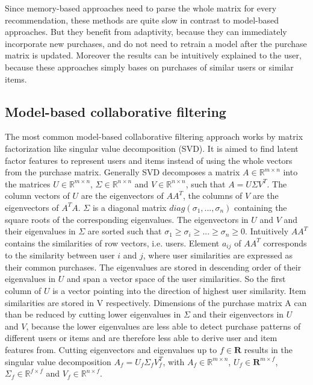 \documentclass[10pt]{reportMaster}
\begin{document}
Since memory-based approaches need to parse the whole matrix for every recommendation, these methods are quite slow in contrast to model-based approaches.
But they benefit from adaptivity, because they can immediately incorporate new purchases, and do not need to retrain a model after the purchase matrix is updated.
Moreover the results can be intuitively explained to the user, because these approaches simply bases on purchases of similar users or similar items.

\subsection{Model-based collaborative filtering}
The most common model-based collaborative filtering approach works by matrix factorization like singular value decomposition (SVD).
It is aimed to find latent factor features to represent users and items instead of using the whole vectors from the purchase matrix.
Generally SVD decomposes a matrix $A \in \mathds{R}^{m \times n}$ into the matrices $U \in \mathds{R}^{m \times n}$, $\Sigma \in \mathds{R}^{n \times n}$ and $V \in \mathds{R}^{n \times n}$, such that $A = U \Sigma V^T$.
The column vectors of $U$ are the eigenvectors of $AA^T$, the columns of $V$ are the eigenvectors of $A^TA$.
$\Sigma$ is a diagonal matrix $diag(\sigma_1, ..., \sigma_n)$ containing the square roots of the corresponding eigenvalues.  %
The eigenvectors in $U$ and $V$ and their eigenvalues in $\Sigma$ are sorted such that $\sigma_1 \geq \sigma_i \geq ... \geq \sigma_n \geq 0$.
Intuitively $AA^T$ contains the similarities of row vectors, i.e. users.
Element $a_{ij}$ of $AA^T$ corresponds to the similarity between user $i$ and $j$, where user similarities are expressed as their common purchases.
The eigenvalues are stored in descending order of their eigenvalues in $U$ and span a vector space of the user similarities.
So the first column of $U$ is a vector pointing into the direction of highest user similarity. %
Item similarities are stored in V respectively.
Dimensions of the purchase matrix A can than be reduced by cutting lower eigenvalues in $\Sigma$ and their eigenvectors in $U$ and $V$, because the lower eigenvalues are less able to detect purchase patterns of different users or items and are therefore less able to derive user and item features from.
Cutting eigenvectors and eigenvalues up to $f \in \mathbf{R}$ results in the singular value decomposition $A_f = U_f \Sigma_f V_f^T$, with $A_f \in \mathds{R}^{m \times n}$, $U_f \in \mathbf{R}^{m \times f}$, $\Sigma_f \in \mathds{R}^{f \times f}$ and $V_f \in \mathds{R}^{n \times f}$.
\end{document}
